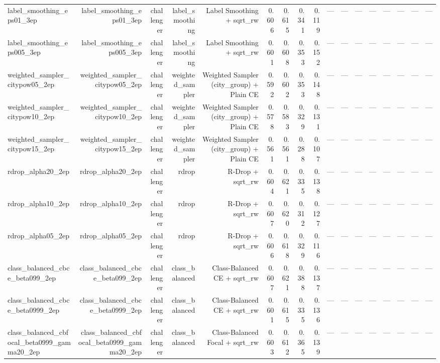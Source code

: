 \begin{tabular}{lrrrrrrrrrrrrrrrr}
label\_smoothing\_eps01\_3ep & label\_smoothing\_eps01\_3ep & challenger & label\_smoothing & Label Smoothing + sqrt\_rw & 0.606 & 0.615 & 0.341 & 0.119 & --- & --- & --- & --- & --- & --- & --- & --- \\
label\_smoothing\_eps005\_3ep & label\_smoothing\_eps005\_3ep & challenger & label\_smoothing & Label Smoothing + sqrt\_rw & 0.601 & 0.608 & 0.353 & 0.152 & --- & --- & --- & --- & --- & --- & --- & --- \\
weighted\_sampler\_citypow05\_2ep & weighted\_sampler\_citypow05\_2ep & challenger & weighted\_sampler & Weighted Sampler (city\_group) + Plain CE & 0.592 & 0.602 & 0.353 & 0.148 & --- & --- & --- & --- & --- & --- & --- & --- \\
weighted\_sampler\_citypow10\_2ep & weighted\_sampler\_citypow10\_2ep & challenger & weighted\_sampler & Weighted Sampler (city\_group) + Plain CE & 0.578 & 0.583 & 0.329 & 0.131 & --- & --- & --- & --- & --- & --- & --- & --- \\
weighted\_sampler\_citypow15\_2ep & weighted\_sampler\_citypow15\_2ep & challenger & weighted\_sampler & Weighted Sampler (city\_group) + Plain CE & 0.561 & 0.561 & 0.288 & 0.107 & --- & --- & --- & --- & --- & --- & --- & --- \\
rdrop\_alpha20\_2ep & rdrop\_alpha20\_2ep & challenger & rdrop & R-Drop + sqrt\_rw & 0.604 & 0.621 & 0.335 & 0.138 & --- & --- & --- & --- & --- & --- & --- & --- \\
rdrop\_alpha10\_2ep & rdrop\_alpha10\_2ep & challenger & rdrop & R-Drop + sqrt\_rw & 0.607 & 0.620 & 0.312 & 0.127 & --- & --- & --- & --- & --- & --- & --- & --- \\
rdrop\_alpha05\_2ep & rdrop\_alpha05\_2ep & challenger & rdrop & R-Drop + sqrt\_rw & 0.606 & 0.618 & 0.329 & 0.116 & --- & --- & --- & --- & --- & --- & --- & --- \\
class\_balanced\_cbce\_beta099\_2ep & class\_balanced\_cbce\_beta099\_2ep & challenger & class\_balanced & Class-Balanced CE + sqrt\_rw & 0.607 & 0.621 & 0.388 & 0.137 & --- & --- & --- & --- & --- & --- & --- & --- \\
class\_balanced\_cbce\_beta0999\_2ep & class\_balanced\_cbce\_beta0999\_2ep & challenger & class\_balanced & Class-Balanced CE + sqrt\_rw & 0.601 & 0.615 & 0.335 & 0.136 & --- & --- & --- & --- & --- & --- & --- & --- \\
class\_balanced\_cbfocal\_beta0999\_gamma20\_2ep & class\_balanced\_cbfocal\_beta0999\_gamma20\_2ep & challenger & class\_balanced & Class-Balanced Focal + sqrt\_rw & 0.603 & 0.612 & 0.365 & 0.139 & --- & --- & --- & --- & --- & --- & --- & --- \\

\end{tabular}
